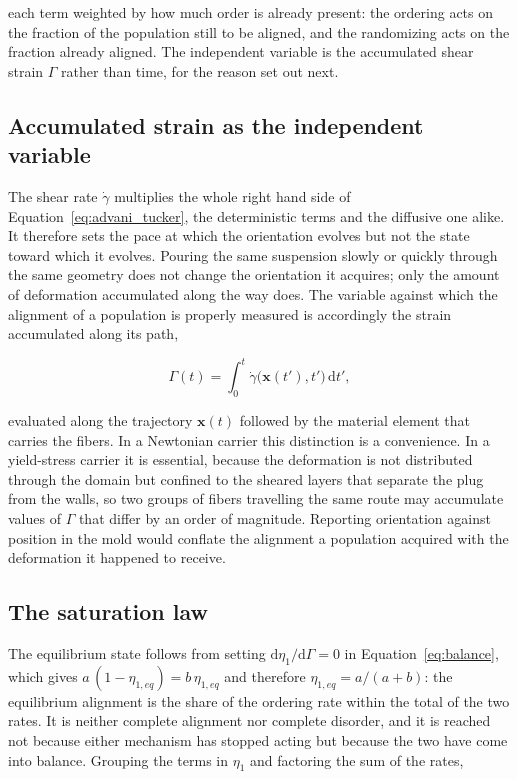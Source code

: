 \documentclass[%
  aip,
  pof,          %
  reprint,      %
  floatfix
]{revtex4-2}
\begin{document}
each term weighted by how much order is already present: the ordering acts on the fraction of the population still to be aligned, and the randomizing acts on the fraction already aligned. The independent variable is the accumulated shear strain $\Gamma$ rather than time, for the reason set out next.

\subsection{Accumulated strain as the independent variable}
\label{sec:governing_strain}

The shear rate $\dot{\gamma}$ multiplies the whole right hand side of Equation~\eqref{eq:advani_tucker}, the deterministic terms and the diffusive one alike. It therefore sets the pace at which the orientation evolves but not the state toward which it evolves. Pouring the same suspension slowly or quickly through the same geometry does not change the orientation it acquires; only the amount of deformation accumulated along the way does. The variable against which the alignment of a population is properly measured is accordingly the strain accumulated along its path,

\begin{equation}
    \Gamma(t) = \int_{0}^{t} \dot{\gamma}\big(\bm{x}(t'),t'\big)\,\mathrm{d}t',
    \label{eq:accumulated_strain}
\end{equation}

evaluated along the trajectory $\bm{x}(t)$ followed by the material element that carries the fibers. In a Newtonian carrier this distinction is a convenience. In a yield-stress carrier it is essential, because the deformation is not distributed through the domain but confined to the sheared layers that separate the plug from the walls, so two groups of fibers travelling the same route may accumulate values of $\Gamma$ that differ by an order of magnitude. Reporting orientation against position in the mold would conflate the alignment a population acquired with the deformation it happened to receive.

\subsection{The saturation law}
\label{sec:governing_law}

The equilibrium state follows from setting $\mathrm{d}\eta_1/\mathrm{d}\Gamma = 0$ in Equation~\eqref{eq:balance}, which gives $a\,(1-\eta_{1,eq}) = b\,\eta_{1,eq}$ and therefore $\eta_{1,eq} = a/(a+b)$: the equilibrium alignment is the share of the ordering rate within the total of the two rates. It is neither complete alignment nor complete disorder, and it is reached not because either mechanism has stopped acting but because the two have come into balance. Grouping the terms in $\eta_1$ and factoring the sum of the rates,
\end{document}
